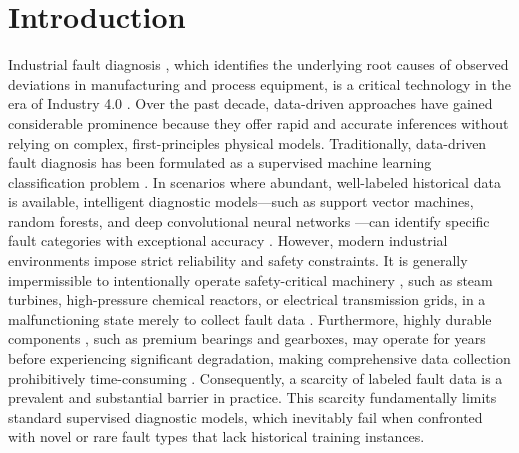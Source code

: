 \section{Introduction}

Industrial fault diagnosis \cite{precup2015overview}, which identifies the underlying root causes of observed deviations in manufacturing and process equipment, is a critical technology in the era of Industry 4.0 \cite{precup2015overview}. Over the past decade, data-driven approaches have gained considerable prominence because they offer rapid and accurate inferences without relying on complex, first-principles physical models. Traditionally, data-driven fault diagnosis \cite{zhao2021semisupervised} has been formulated as a supervised machine learning classification problem \cite{zhao2021semisupervised,du2023fault} \cite{wang2020deep}. In scenarios where abundant, well-labeled historical data is available, intelligent diagnostic models—such as support vector machines, random forests, and deep convolutional neural networks \cite{he2016deep}—can identify specific fault categories with exceptional accuracy \cite{wang2020deep}. However, modern industrial environments impose strict reliability and safety constraints. It is generally impermissible to intentionally operate safety-critical machinery \cite{lee2014prognostics}, such as steam turbines, high-pressure chemical reactors, or electrical transmission grids, in a malfunctioning state merely to collect fault data \cite{wang2020deep}. Furthermore, highly durable components \cite{zhang2022intelligent}, such as premium bearings and gearboxes, may operate for years before experiencing significant degradation, making comprehensive data collection prohibitively time-consuming \cite{wang2020deep}. Consequently, a scarcity of labeled fault data is a prevalent and substantial barrier in practice. This scarcity fundamentally limits standard supervised diagnostic models, which inevitably fail when confronted with novel or rare fault types that lack historical training instances.


